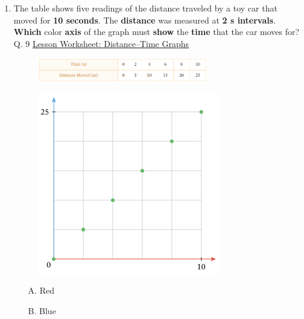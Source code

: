 \documentclass[A4,12pt]{article}
\begin{document}
\begin{enumerate}[label=\bfseries (\arabic*)]
\item The table shows five readings of the distance traveled by a toy car that moved for \textbf{10 seconds}. The \textbf{distance} was measured at \textbf{2 s intervals}. \textbf{Which} color \textbf{axis} of the graph must \textbf{show} the \textbf{time} that the car moves for? \cite{Nagwa} Q. 9 \href{https://www.nagwa.com/en/worksheets/932192593730/}{Lesson Worksheet: Distance–Time Graphs}
%
\begin{figure}[H]
    \centering
    \includegraphics[width=0.7\textwidth]{Nagwa_Q9_kin-1.png}
\end{figure}
%
\begin{figure}[H]
    \centering
    \includegraphics{Nagwa_Q9_kin-2.png}
\end{figure}
%
\begin{multicols}{2}
\begin{itemize}
    \item[A.] Red
    \item[B.] Blue
\end{itemize}
\end{multicols}



















\end{enumerate}
\end{document}
